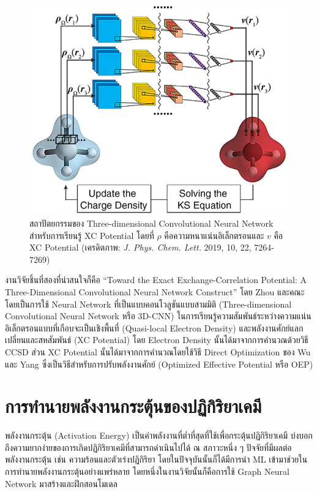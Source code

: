 \begin{figure}[H]
    \centering
    \includegraphics[width=0.75\linewidth]{fig/ml-xc-conv-network.jpeg}
    \caption{สถาปัตยกรรมของ Three-dimensional Convolutional Neural Network สำหรับการเรียนรู้ XC Potential โดยที่ $\rho$ คือความหนาแน่นอิเล็กตรอนและ $v$ คือ XC Potential (เครดิตภาพ: \textit{J. Phys. Chem. Lett.} 2019, 10, 22, 7264-7269)}
    \label{fig:xc_3dcnn}
\end{figure}

งานวิจัยชิ้นที่สองที่น่าสนใจก็คือ \enquote{Toward the Exact Exchange-Correlation Potential: A Three-Dimensional Convolutional Neural Network Construct} โดย Zhou และคณะ\autocite{zhou2019} โดยเป็นการใช้ Neural Network ที่เป็นแบบคอนโวลูชันแบบสามมิติ (Three-dimensional Convolutional Neural Network หรือ 3D-CNN) ในการเรียนรู้ความสัมพันธ์ระหว่างความแน่นอิเล็กตรอนแบบที่เกือบจะเป็นเชิงพื้นที่ (Quasi-local Electron Density) และพลังงานศักย์แลกเปลี่ยนและสหสัมพันธ์ (XC Potential) โดย Electron Density นั้นได้มาจากการคำนวณด้วยวิธี CCSD ส่วน XC Potential นั้นได้มาจากการคำนวณโดยใช้วิธี Direct Optimization ของ Wu และ Yang\autocite{wu2003} ซึ่งเป็นวิธีสำหรับการปรับพลังงานศักย์ (Optimized Effective Potential หรือ OEP)

\section{การทำนายพลังงานกระตุ้นของปฏิกิริยาเคมี}
\label{sec:pred_act_ener}

พลังงานกระตุ้น (Activation Energy) เป็นค่าพลังงานที่ต่ำที่สุดที่ใช้เพื่อกระตุ้นปฏิกิริยาเคมี บ่งบอกถึงความยากง่ายของการเกิดปฏิกิริยาเคมีที่สามารถดำเนินไปได้ ณ สภาวะหนึ่ง ๆ ปัจจัยที่มีผลต่อพลังงานกระตุ้น เช่น ความร้อนและตัวเร่งปฏิกิริยา โดยในปัจจุบันนั้นก็ได้มีการนำ ML เข้ามาช่วยในการทำนายพลังงานกระตุ้นอย่างแพร่หลาย\autocite{lewis-atwell2022} โดยหนึ่งในงานวิจัยนั้นก็คือการใช้ Graph Neural Network มาสร้างและฝึกสอนโมเดล\autocite{grambow2020}


